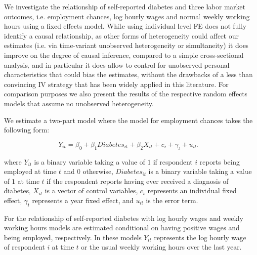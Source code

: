 \documentclass[12pt,english,british]{article}
\begin{document}
We investigate the relationship of self-reported diabetes and three
labor market outcomes, i.e. employment chances, log hourly wages
and normal weekly working hours using a fixed effects model. While using individual level \ac{FE} does not fully
identify a causal relationship, as other forms of heterogeneity could
affect our estimates (i.e. via time-variant unobserved heterogeneity
or simultaneity) it does improve on the degree of causal inference,
compared to a simple cross-sectional analysis, and in particular it
does allow to control for unobserved personal characteristics that
could bias the estimates, without the drawbacks of a less than convincing
\ac{IV} strategy that has been widely applied in this literature. 
For comparison purposes we also present the results of the respective random effects models that assume no unobserved heterogeneity.

We estimate a two-part model where the model for employment chances
takes the following form:

\noindent 
\begin{equation}
Y_{it}=\beta_{0}+\beta_{1}Diabetes_{it}+\beta_{2}X_{it}+c_{i}+\gamma_{t}+u_{it}.\label{eq:employed}
\end{equation}


where $Y_{it}$ is a binary variable taking a value of $1$ if respondent
$i$ reports being employed at time $t$ and $0$ otherwise, $Diabetes_{it}$
is a binary variable taking a value of $1$ at time $t$ if the respondent
reports having ever received a diagnosis of diabetes, $X_{it}$ is
a vector of control variables, $c_{i}$ represents an individual fixed
effect, $\gamma_{t}$ represents a year fixed effect, and $u_{it}$
is the error term.

For the relationship of self-reported diabetes with log hourly wages
and weekly working hours models are estimated conditional on having positive wages and being
employed, respectively. In these models $Y_{it}$ represents the log hourly wage
of respondent $i$ at time $t$ or the usual weekly working hours
over the last year.
\end{document}
